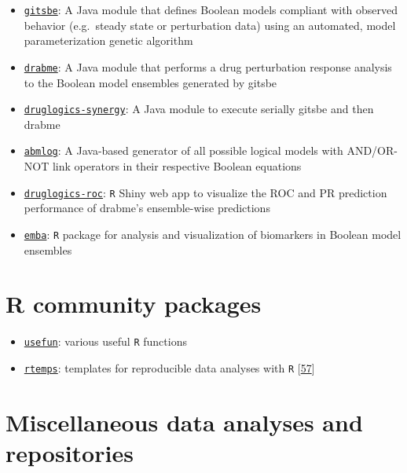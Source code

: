 \documentclass[
  12pt,
]{book}
\providecommand{\tightlist}{%
  \setlength{\itemsep}{0pt}\setlength{\parskip}{0pt}}
\begin{document}
\begin{itemize}
\tightlist
\item
  \href{https://github.com/druglogics/gitsbe}{\texttt{gitsbe}}: A Java module that defines Boolean models compliant with observed behavior (e.g.~steady state or perturbation data) using an automated, model parameterization genetic algorithm
\item
  \href{https://github.com/druglogics/drabme}{\texttt{drabme}}: A Java module that performs a drug perturbation response analysis to the Boolean model ensembles generated by gitsbe
\item
  \href{https://github.com/druglogics/druglogics-synergy}{\texttt{druglogics-synergy}}: A Java module to execute serially gitsbe and then drabme
\item
  \href{https://github.com/druglogics/abmlog}{\texttt{abmlog}}: A Java-based generator of all possible logical models with AND/OR-NOT link operators in their respective Boolean equations
\item
  \href{https://github.com/druglogics/druglogics-roc}{\texttt{druglogics-roc}}: \texttt{R} Shiny web app to visualize the ROC and PR prediction performance of drabme's ensemble-wise predictions
\item
  \href{https://github.com/bblodfon/emba/}{\texttt{emba}}: \texttt{R} package for analysis and visualization of biomarkers in Boolean model ensembles
\end{itemize}

\hypertarget{r-community-packages}{%
\section*{R community packages}\label{r-community-packages}}

\begin{itemize}
\tightlist
\item
  \href{https://github.com/bblodfon/usefun}{\texttt{usefun}}: various useful \texttt{R} functions
\item
  \href{https://github.com/bblodfon/rtemps}{\texttt{rtemps}}: templates for reproducible data analyses with \texttt{R} {[}\protect\hyperlink{ref-rtemps}{57}{]}
\end{itemize}

\hypertarget{misc-links}{%
\section*{Miscellaneous data analyses and repositories}\label{misc-links}}
\end{document}
